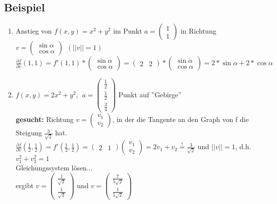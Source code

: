 \subsection{Beispiel}
\begin{enumerate}
	\item
	Anstieg von $f(x,y)=x^2+y^2$ im Punkt $a=\begin{pmatrix}1 \\ 1 \end{pmatrix}$ in Richtung $v=\begin{pmatrix}\sin \alpha \\ \cos \alpha\end{pmatrix} \ \ (||v||=1)$\\
	$\frac{\partial f}{\partial v}(1,1)=f'(1,1)*\begin{pmatrix}\sin \alpha \\ \cos \alpha\end{pmatrix}=\begin{pmatrix}2 & 2\end{pmatrix}*\begin{pmatrix}\sin \alpha \\ \cos \alpha	\end{pmatrix}=2*\sin \alpha+ 2*\cos\alpha$
	
	\item
	$f(x,y)=2x^2+y^2, \ \ a=\begin{pmatrix}\frac{1}{2} \\ \frac{1}{2} \\ \frac{3}{4}\end{pmatrix}$ Punkt auf ''Gebirge''\\
	\textbf{gesucht:} Richtung $v=\begin{pmatrix}v_1 \\ v_2\end{pmatrix}$, in der die Tangente an den Graph von f die Steigung $\frac{3}{\sqrt{2}}$ hat.\\
	$\frac{\partial f}{\partial v}\left(\frac{1}{2},\frac{1}{2}\right)=f'\left(\frac{1}{2},\frac{1}{2}\right) = \begin{pmatrix}2 & 1\end{pmatrix}\begin{pmatrix}v_1 \\ v_2\end{pmatrix}=2v_1+v_2 \stackrel{!}{=} \frac{3}{\sqrt{2}}$ und $||v||=1$, d.h. $v_1^2+v_2^2=1$\\
	Gleichungssystem lösen...\\
	ergibt $v=\begin{pmatrix}\frac{1}{\sqrt{2}} \\ \frac{1}{\sqrt{2}}\end{pmatrix}$ und $v=\begin{pmatrix}\frac{7}{5\sqrt{2}} \\ \frac{1}{5 \sqrt{2}}\end{pmatrix}$
\end{enumerate}

